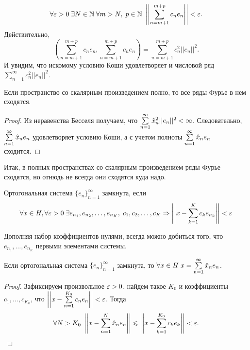 $$
    \forall \varepsilon>0\; \exists N\in \mathbb{N}\; \forall m>N,\; p\in \mathbb{N} \  \left|\left|\sum\limits_{n=m+1}^{m+p}c_ne_n \right|\right| < \varepsilon.
$$
Действительно,
$$
    \left(\sum\limits_{n=m+1}^{m+p}c_ne_n, \sum\limits_{n=m+1}^{m+p}c_ne_n\right) =  \sum\limits_{n=m+1}^{m+p}c_n^2 ||e_n||^2.
$$
И увидим, что искомому условию Коши удовлетворяет и числовой ряд $\sum\limits_{n=1}^{\infty}c_n^2||e_n||^2$.
\begin{Consequence}
    Если пространство со скалярным произведением полно, то все ряды Фурье в нем сходятся.
\end{Consequence}
\begin{proof}
    Из неравенства Бесселя получаем, что
    $\sum\limits_{n=1}^{\infty} \hat{x}_n^2 ||e_n||^2 < \infty$. Следовательно, $ \sum\limits_{n=1}^{\infty} \hat{x}_ne_n 
    $ удовлетворяет условию Коши, а с учетом полноты $\sum\limits_{n=1}^{\infty}\hat{x}_n e_n$ сходится.
\end{proof}
Итак, в полных пространствах со скалярным произведением ряды Фурье сходятся, но отнюдь не всегда они сходятся куда надо.
\begin{Def}
    Ортогональная система $\{e_n\}_{n=1}^{\infty}$ замкнута, если 
    $$\forall x\in H, \forall \varepsilon >0\; \exists e_{n_1}, e_{n_2}, \ldots, e_{n_K},\; c_1, c_2, \ldots, c_K \Rightarrow \left|\left|x - \sum\limits_{k=1}^{K} c_k e_{n_k}\right|\right|<\varepsilon
    $$
\end{Def}
\begin{Comment}
    Дополняя набор коэффициентов нулями, всегда можно добиться того, что $ e_{n_1}, \ldots, e_{n_K}$ первыми элементами системы.
\end{Comment}
\begin{Statement}
    Если ортогональная система $\{e_n\}_{n=1}^{\infty}$ замкнута, то $\forall x\in H\; x = \sum\limits_{n=1}^{\infty}\hat{x}_n e_{n}$.
\end{Statement}
\begin{proof}
    Зафиксируем произвольное $\varepsilon >0$, найдем такое $K_0$ и коэффициенты $c_1, \ldots, c_{K_0}$, что $\left|\left| x - \sum\limits_{n=1}^{K_0} c_ne_n \right|\right| < \varepsilon$. Тогда
    $$
        \forall N>K_0 \; \left|\left|x - \sum\limits_{n=1}^{N}\hat{x}_ne_n\right|\right|\leqslant \left|\left|x - \sum\limits_{k=1}^{K_0}c_ke_k \right|\right| < \varepsilon.
    $$
\end{proof}
